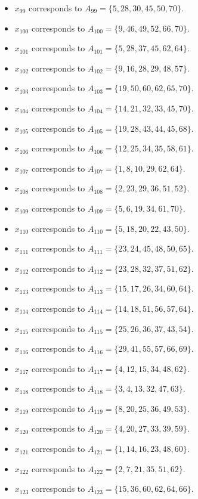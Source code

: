 \documentclass[11pt]{article}
\begin{document}
\begin{itemize}
\item $x_{99}$ corresponds to $A_{99}=\{5, 28, 30, 45, 50, 70\}$.
\item $x_{100}$ corresponds to $A_{100}=\{9, 46, 49, 52, 66, 70\}$.
\item $x_{101}$ corresponds to $A_{101}=\{5, 28, 37, 45, 62, 64\}$.
\item $x_{102}$ corresponds to $A_{102}=\{9, 16, 28, 29, 48, 57\}$.
\item $x_{103}$ corresponds to $A_{103}=\{19, 50, 60, 62, 65, 70\}$.
\item $x_{104}$ corresponds to $A_{104}=\{14, 21, 32, 33, 45, 70\}$.
\item $x_{105}$ corresponds to $A_{105}=\{19, 28, 43, 44, 45, 68\}$.
\item $x_{106}$ corresponds to $A_{106}=\{12, 25, 34, 35, 58, 61\}$.
\item $x_{107}$ corresponds to $A_{107}=\{1, 8, 10, 29, 62, 64\}$.
\item $x_{108}$ corresponds to $A_{108}=\{2, 23, 29, 36, 51, 52\}$.
\item $x_{109}$ corresponds to $A_{109}=\{5, 6, 19, 34, 61, 70\}$.
\item $x_{110}$ corresponds to $A_{110}=\{5, 18, 20, 22, 43, 50\}$.
\item $x_{111}$ corresponds to $A_{111}=\{23, 24, 45, 48, 50, 65\}$.
\item $x_{112}$ corresponds to $A_{112}=\{23, 28, 32, 37, 51, 62\}$.
\item $x_{113}$ corresponds to $A_{113}=\{15, 17, 26, 34, 60, 64\}$.
\item $x_{114}$ corresponds to $A_{114}=\{14, 18, 51, 56, 57, 64\}$.
\item $x_{115}$ corresponds to $A_{115}=\{25, 26, 36, 37, 43, 54\}$.
\item $x_{116}$ corresponds to $A_{116}=\{29, 41, 55, 57, 66, 69\}$.
\item $x_{117}$ corresponds to $A_{117}=\{4, 12, 15, 34, 48, 62\}$.
\item $x_{118}$ corresponds to $A_{118}=\{3, 4, 13, 32, 47, 63\}$.
\item $x_{119}$ corresponds to $A_{119}=\{8, 20, 25, 36, 49, 53\}$.
\item $x_{120}$ corresponds to $A_{120}=\{4, 20, 27, 33, 39, 59\}$.
\item $x_{121}$ corresponds to $A_{121}=\{1, 14, 16, 23, 48, 60\}$.
\item $x_{122}$ corresponds to $A_{122}=\{2, 7, 21, 35, 51, 62\}$.
\item $x_{123}$ corresponds to $A_{123}=\{15, 36, 60, 62, 64, 66\}$.

\end{itemize}
\end{document}
